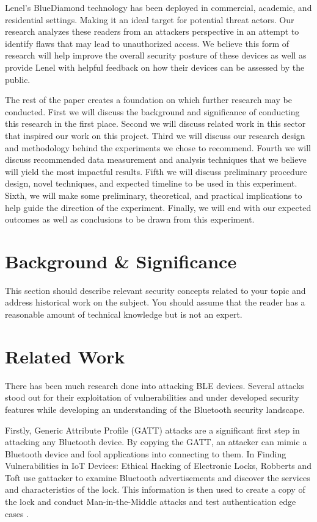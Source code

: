 \documentclass[10pt,twocolumn,letterpaper]{article}
\begin{document}
Lenel's BlueDiamond technology has been deployed in commercial, academic, and residential settings. Making it an ideal target for potential threat actors. Our research analyzes these readers from an attackers perspective in an attempt to identify flaws that may lead to unauthorized access. We believe this form of research will help improve the overall security posture of these devices as well as provide Lenel with helpful feedback on how their devices can be assessed by the public.

The rest of the paper creates a foundation on which further research may be conducted. First we will discuss the background and significance of conducting this research in the first place. Second we will discuss related work in this sector that inspired our work on this project. Third we will discuss our research design and methodology behind the experiments we chose to recommend. Fourth we will discuss recommended data measurement and analysis techniques that we believe will yield the most impactful results. Fifth we will discuss preliminary procedure design, novel techniques, and expected timeline to be used in this experiment. Sixth, we will make some preliminary, theoretical, and practical implications to help guide the direction of the experiment. Finally, we will end with our expected outcomes as well as conclusions to be drawn from this experiment.

\section{Background \& Significance}
This  section  should  describe  relevant  security  concepts  related  to  your  topic  and address  historical  work  on  the  subject.  You  should  assume  that  the  reader  has  a reasonable amount of technical knowledge but is not an expert.

\section{Related Work}
There has been much research done into attacking BLE devices. Several attacks stood out for their exploitation of vulnerabilities and under developed security features while developing an understanding of the Bluetooth security landscape.

Firstly, Generic Attribute Profile (GATT) attacks are a significant first step in attacking any Bluetooth device. By copying the GATT, an attacker can mimic a Bluetooth device and fool applications into connecting to them. In Finding Vulnerabilities in IoT Devices: Ethical Hacking of Electronic Locks, Robberts and Toft use gattacker to examine Bluetooth advertisements and discover the services and characteristics of the lock. This information is then used to create a copy of the lock and conduct Man-in-the-Middle attacks and test authentication edge cases \cite{KTH}.
\end{document}
